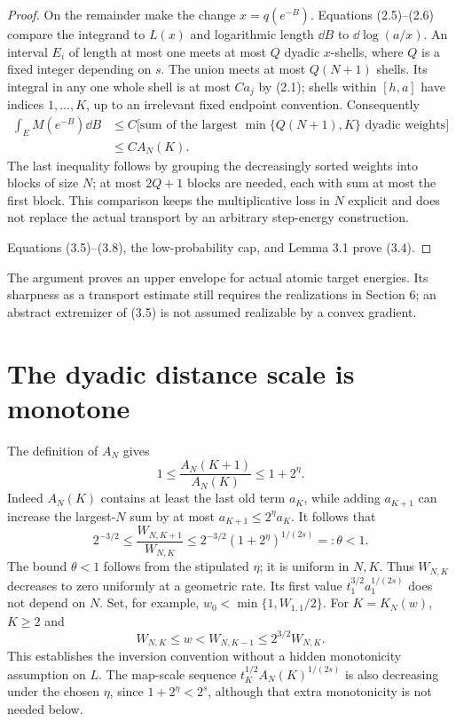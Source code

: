 \begin{proof}
On the remainder make the change $x=q(e^{-B})$. Equations (2.5)--(2.6) compare the integrand to $L(x)$ and logarithmic length $\dd B$ to $\dd\log(a/x)$. An interval $E_i$ of length at most one meets at most $Q$ dyadic $x$-shells, where $Q$ is a fixed integer depending on $s$. The union meets at most $Q(N+1)$ shells. Its integral in any one whole shell is at most $Ca_j$ by (2.1); shells within $[h,a]$ have indices $1,\ldots,K$, up to an irrelevant fixed endpoint convention. Consequently
\begin{equation}
 \begin{split}
 \int_E M(e^{-B})\dd B
 &\le C\bigl[\text{sum of the largest $\min\{Q(N+1),K\}$ dyadic weights}\bigr]\\
 &\le CA_N(K).
 \end{split}\tag{3.8}
\end{equation}
The last inequality follows by grouping the decreasingly sorted weights into blocks of size $N$; at most $2Q+1$ blocks are needed, each with sum at most the first block. This comparison keeps the multiplicative loss in $N$ explicit and does not replace the actual transport by an arbitrary step-energy construction.

Equations (3.5)--(3.8), the low-probability cap, and Lemma 3.1 prove (3.4).
\end{proof}
The argument proves an upper envelope for actual atomic target energies. Its sharpness as a transport estimate still requires the realizations in Section 6; an abstract extremizer of (3.5) is not assumed realizable by a convex gradient.

\section{The dyadic distance scale is monotone}
The definition of $A_N$ gives
\begin{equation}
 1\le\frac{A_N(K+1)}{A_N(K)}\le1+2^\eta.\tag{4.1}
\end{equation}
Indeed $A_N(K)$ contains at least the last old term $a_K$, while adding $a_{K+1}$ can increase the largest-$N$ sum by at most $a_{K+1}\le2^\eta a_K$. It follows that
\begin{equation}
 2^{-3/2}\le\frac{W_{N,K+1}}{W_{N,K}}
 \le2^{-3/2}(1+2^\eta)^{1/(2s)}=:\theta<1.\tag{4.2}
\end{equation}
The bound $\theta<1$ follows from the stipulated $\eta$; it is uniform in $N,K$. Thus $W_{N,K}$ decreases to zero uniformly at a geometric rate. Its first value $t_1^{3/2}a_1^{1/(2s)}$ does not depend on $N$. Set, for example, $w_0<\min\{1,W_{1,1}/2\}$. For $K=K_N(w)$, $K\ge2$ and
\begin{equation}
 W_{N,K}\le w<W_{N,K-1}\le2^{3/2}W_{N,K}.\tag{4.3}
\end{equation}
This establishes the inversion convention without a hidden monotonicity assumption on $L$. The map-scale sequence $t_K^{1/2}A_N(K)^{1/(2s)}$ is also decreasing under the chosen $\eta$, since $1+2^\eta<2^s$, although that extra monotonicity is not needed below.

